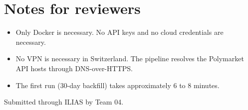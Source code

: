 \documentclass[11pt,a4paper]{article}
\begin{document}
\section*{Notes for reviewers}

\begin{itemize}\itemsep0.2em
  \item Only Docker is necessary. No API keys and no cloud credentials are necessary.
  \item No VPN is necessary in Switzerland. The pipeline resolves the Polymarket API hosts through DNS-over-HTTPS.
  \item The first run (30-day backfill) takes approximately 6 to 8 minutes.
\end{itemize}

\vfill
{\small Submitted through ILIAS by Team 04.}
\end{document}
